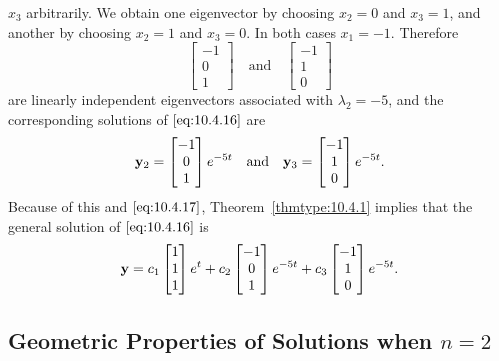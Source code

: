\documentclass{ximera}
\begin{document}
\begin{example}
\begin{explanation}
$x_3$  arbitrarily. We obtain one eigenvector by choosing $x_2=0$
and $x_3=1$, and another by choosing $x_2=1$ and $x_3=0$. In both
cases $x_1=-1$. Therefore
$$
\begin{bmatrix}-1\\0\\1\end{bmatrix}\quad
\mbox{and}\quad\begin{bmatrix}-1\\1\\0
\end{bmatrix}
$$
are linearly independent eigenvectors associated with  $\lambda_2=
-5$, and the corresponding solutions of  $\eqref{eq:10.4.16}$ are
$$
{\bf y}_2=\begin{bmatrix}-1\\0\\1\end{bmatrix}e^{-5t}\quad
\mbox{and}\quad{\bf y}_3=\begin{bmatrix}-1\\1\\
0\end{bmatrix}e^{-5t}.
$$
Because of this and  $\eqref{eq:10.4.17}$, Theorem~\ref{thmtype:10.4.1} implies
that  the general solution of $\eqref{eq:10.4.16}$ is
$$
{\bf y}=c_1\begin{bmatrix}1\\1\\
1\end{bmatrix}e^t+c_2
\begin{bmatrix}-1\\0\\1\end{bmatrix}
e^{-5t}+c_3\begin{bmatrix}-1\\1\\0\end{bmatrix}e^{-5t}.
 $$

\end{explanation}
\end{example}

\subsection*{Geometric Properties of Solutions when  $n=2$}
\end{document}
